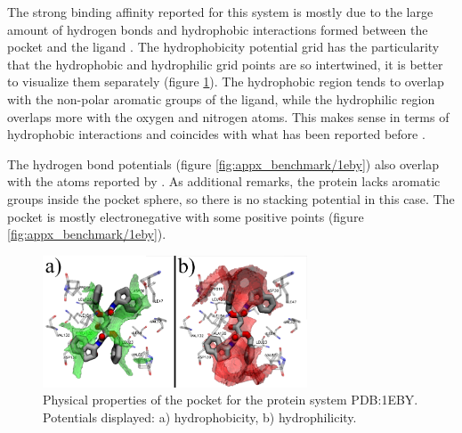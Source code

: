      The strong binding affinity reported for this system is mostly due to the large amount of hydrogen bonds and hydrophobic interactions formed between the pocket and the ligand \cite{benchmark_strong_2021}. The hydrophobicity potential grid has the particularity that the hydrophobic and hydrophilic grid points are so intertwined, it is better to visualize them separately (figure \ref{fig:benchmark/1eby}). The hydrophobic region tends to overlap with the non-polar aromatic groups of the ligand, while the hydrophilic region overlaps more with the oxygen and nitrogen atoms. This makes sense in terms of hydrophobic interactions and coincides with what has been reported before \cite{benchmark_strong_2021}.

      The hydrogen bond potentials (figure \ref{fig:appx_benchmark/1eby}) also overlap with the atoms reported by \cite{benchmark_strong_2021}. As additional remarks, the protein lacks aromatic groups inside the pocket sphere, so there is no stacking potential in this case. The pocket is mostly electronegative with some positive points (figure \ref{fig:appx_benchmark/1eby}).

      \begin{figure}[H]
        \centering
        \includegraphics[width=0.7\textwidth]{figures/results/benchmark_prot/1eby.png}
        \caption{\label{fig:benchmark/1eby} Physical properties of the pocket for the protein system PDB:1EBY. Potentials displayed: a) hydrophobicity, b) hydrophilicity.}
      \end{figure}
    \pagebreak

